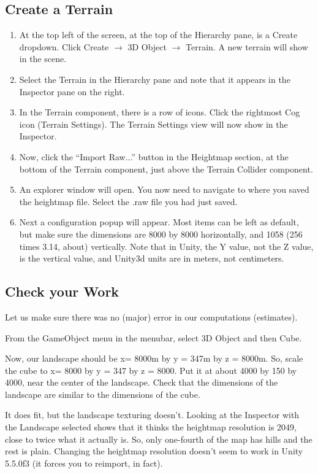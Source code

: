 \documentclass[letter,12pt]{article}
\begin{document}
\subsection{Create a Terrain}
\begin{enumerate}
\item At the top left of the screen, at the top of the  Hierarchy pane, is a Create dropdown.  Click Create $\rightarrow$ 3D Object $\rightarrow$ Terrain.  A new terrain will show in the scene.
\item Select the Terrain in the Hierarchy pane and note that it appears in the Inspector pane on the right.
\item In the Terrain component, there is a row of icons.  Click the rightmost Cog icon (Terrain Settings).  The Terrain Settings view will now show in the Inspector.
\item Now, click the “Import Raw...” button in the Heightmap section, at the bottom of the Terrain component, just above the Terrain Collider component.
\item An explorer window will open.  You now need to navigate to where you saved the heightmap file. Select the .raw file you had just saved.
\item Next a configuration popup will appear.  Most items can be left as default, but make sure the dimensions are 8000 by 8000 horizontally, and 1058 (256 times 3.14, about) vertically.  Note that in Unity, the Y value, not the Z value, is the vertical value, and Unity3d units are in meters, not centimeters.
\end{enumerate}

\subsection{Check your Work}

Let us make sure there was no (major) error in our computations (estimates).  

From the GameObject menu in the menubar, select 3D Object and then Cube.

Now, our landscape should be x= 8000m by y = 347m by z = 8000m.  So, scale the cube to x= 8000 by y = 347 by z = 8000. Put it at about 4000 by 150 by 4000, near the center of the landscape.  Check that the dimensions of the landscape are similar to the dimensions of the cube.

It does fit, but the landscape texturing doesn’t.  Looking at the Inspector with the Landscape selected shows that it thinks the heightmap resolution is 2049, close to twice what it actually is.  So, only one-fourth of the map has hills and the rest is plain.  Changing the heightmap resolution doesn’t seem to work in Unity 5.5.0f3 (it forces you to reimport, in fact).   
\end{document}
